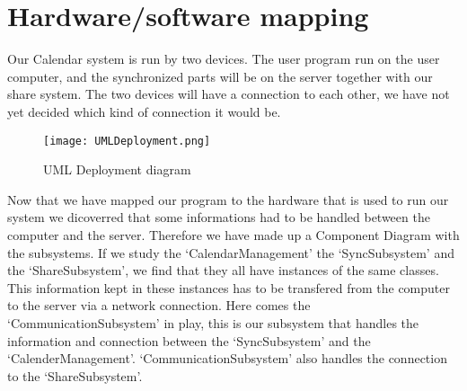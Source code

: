 \section{Hardware/software mapping}

Our Calendar system is run by two devices. The user program run on the user computer, and the synchronized parts will be on the server together with our share system. The two devices will have a connection to each other, we have not yet decided which kind of connection it would be.

\begin{figure}[h]
\centering
\texttt{[image: UMLDeployment.png]}
\caption{UML Deployment diagram \label{overflow}}
\label{figur:UMLDeployment}
\end{figure}

Now that we have mapped our program to the hardware that is used to run our system we dicoverred that some informations had to be handled between the computer and the server. Therefore we have made up a Component Diagram with the subsystems. If we study the ‘CalendarManagement’ the ‘SyncSubsystem’ and the ‘ShareSubsystem’, we find that they all have instances of the same classes. This information kept in these instances has to be transfered from the computer to the server via a network connection. Here comes the ‘CommunicationSubsystem’ in play, this is our subsystem that handles the information and connection between the ‘SyncSubsystem’ and the ‘CalenderManagement’. ‘CommunicationSubsystem’ also handles the connection to the ‘ShareSubsystem’.